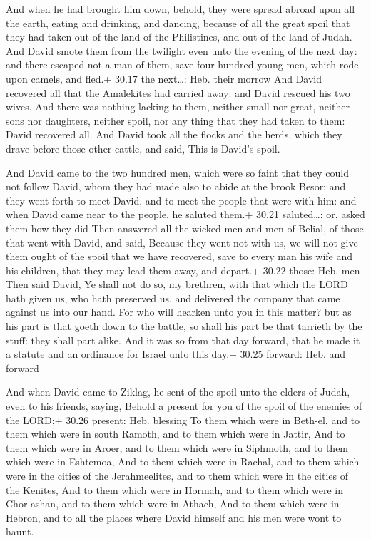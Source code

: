  And when he had brought him down, behold, they were
spread abroad upon all the earth, eating and drinking, and dancing,
because of all the great spoil that they had taken out of the land of
the Philistines, and out of the land of Judah.  And David
smote them from the twilight even unto the evening of the next day: and
there escaped not a man of them, save four hundred young men, which rode
upon camels, and fled.+ 30.17 the next\ldots: Heb. their morrow
 And David recovered all that the Amalekites had carried
away: and David rescued his two wives.  And there was
nothing lacking to them, neither small nor great, neither sons nor
daughters, neither spoil, nor any thing that they had taken to them:
David recovered all.  And David took all the flocks and the
herds, which they drave before those other cattle, and said, This is
David's spoil.

 And David came to the two hundred men, which were so
faint that they could not follow David, whom they had made also to abide
at the brook Besor: and they went forth to meet David, and to meet the
people that were with him: and when David came near to the people, he
saluted them.+ 30.21 saluted\ldots: or, asked them how they did
 Then answered all the wicked men and men of Belial, of
those that went with David, and said, Because they went not with us, we
will not give them ought of the spoil that we have recovered, save to
every man his wife and his children, that they may lead them away, and
depart.+ 30.22 those: Heb. men  Then said David, Ye shall
not do so, my brethren, with that which the LORD hath given us, who hath
preserved us, and delivered the company that came against us into our
hand.  For who will hearken unto you in this matter? but as
his part is that goeth down to the battle, so shall his part be that
tarrieth by the stuff: they shall part alike.  And it was
so from that day forward, that he made it a statute and an ordinance for
Israel unto this day.+ 30.25 forward: Heb. and forward

 And when David came to Ziklag, he sent of the spoil unto
the elders of Judah, even to his friends, saying, Behold a present for
you of the spoil of the enemies of the LORD;+ 30.26 present: Heb.
blessing  To them which were in Beth-el, and to them which
were in south Ramoth, and to them which were in Jattir, 
And to them which were in Aroer, and to them which were in Siphmoth, and
to them which were in Eshtemoa,  And to them which were in
Rachal, and to them which were in the cities of the Jerahmeelites, and
to them which were in the cities of the Kenites,  And to
them which were in Hormah, and to them which were in Chor-ashan, and to
them which were in Athach,  And to them which were in
Hebron, and to all the places where David himself and his men were wont
to haunt.

